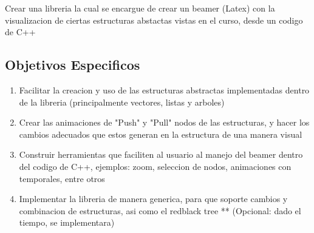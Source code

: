 \documentclass[12pt,letterpaper]{article}     %
\begin{document}
Crear una libreria la cual se encargue de crear un beamer (Latex) con la visualizacion de ciertas estructuras abstactas vistas en el curso, desde un codigo de C++


\subsection{Objetivos Especificos}


\begin{enumerate}
\item Facilitar la creacion y uso de las estructuras abstractas implementadas dentro de la libreria (principalmente vectores, listas y arboles) 
\item Crear las animaciones de "Push" y "Pull" nodos de las estructuras, y hacer los cambios adecuados que estos generan en la estructura de una manera visual
\item Construir herramientas que faciliten al usuario al manejo del beamer dentro del codigo de C++, ejemplos: zoom, seleccion de nodos, animaciones con temporales, entre otros
\item Implementar la libreria de manera generica, para que soporte cambios y combinacion de estructuras, asi como el redblack tree ** (Opcional: dado el tiempo, se implementara)
\end{enumerate}
\end{document}
